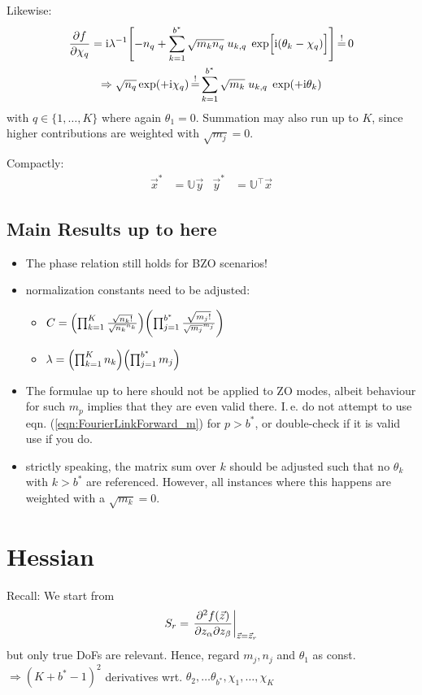 \documentclass[
	english,
	a4paper,
	fontsize=10pt,
	parskip=half,
	titlepage=true,
	DIV=12,
	final
]{scrreprt}
\newcommand*{\Thus}{\ensuremath{\Rightarrow}\xspace}
\newcommand*{\transp}{\ensuremath{^\intercal}}
\newcommand*{\iunit}{\ensuremath{\mathrm{i}}}
\newcommand*{\equalCond}{  \mathop{=}\limits^!  }
\begin{document}
Likewise:
\begin{gather}
	\pdv{f}{\chi_q}
=
	\iunit\lambda^{-1}
	\qty[
		- n_q
		+
		\sum_{k=1}^{b^*}
			\sqrt{m_k n_q} \; u_{k,q} \; \exp[ \Big. \iunit(\theta_k - \chi_q) ]
	]
	\label{eqn:JacobianChi_m}
\equalCond
	0 \\
\Thus
	\sqrt{n_q} \exp(+\iunit \chi_q)
\equalCond
	\sum_{k=1}^{b^*}
	\sqrt{m_k} \; u_{k,q} \; \exp(+\iunit\theta_k)
	\label{eqn:FourierLinkBackward_m}
\end{gather}
with $q \in \{1, \ldots, K\}$ where again $\theta_1 = 0$. Summation may also run up to $K$, since higher contributions are weighted with $\sqrt{m_j} = 0$.

Compactly:
\begin{align}
	\vec{x}^{*} &= \mathbb{U} \vec{y}
&
	\vec{y}^{*} &= \mathbb{U}\transp \vec{x}
	\label{eqn:MatrixCondition_m}
\end{align}

\subsection{Main Results up to here}
\begin{itemize}
\item The phase relation still holds for BZO scenarios!
\item normalization constants need to be adjusted:
	\begin{itemize}
	\item $C =
	\qty( \prod_{k=1}^{K}
		\frac
			{ \sqrt{n_k!} }
			{ \sqrt{n_k}^{n_k} }
	)
	\qty( \prod_{j=1}^{b^*}
		\frac
			{ \sqrt{m_j!} }
			{ \sqrt{m_j}^{m_j} }
	)$
	\item $\lambda =
	\qty( \prod_{k=1}^{K}   n_k )
	\qty( \prod_{j=1}^{b^*} m_j )$
	\end{itemize}
\item The formulae up to here should not be applied to ZO modes, albeit behaviour for such $m_p$
	implies that they are even valid there. I.\,e. do not attempt to use eqn.
	(\ref{eqn:FourierLinkForward_m}) for $p > b^*$, or double-check if it is valid use if you do.
\item strictly speaking, the matrix sum over $k$ should be adjusted such that no $\theta_k$ with
	$k > b^*$ are referenced. However, all instances where this happens are weighted with a
	$\sqrt{m_k} = 0$.
\end{itemize}

\section{Hessian}
Recall: We start from
\begin{align}
	S_r
=
	\eval{
		\pdv{f(\vec{z})}%
			{z_\alpha}{z_\beta}
	}_{\vec{z} = \vec{z}_r}
\end{align}
but only true DoFs are relevant. Hence, regard $m_j, n_j$ and $\theta_1$ as const. \\
\Thus $(K + b^* - 1)^{2}$ derivatives wrt. $\theta_2, \ldots \theta_{b^*}, \chi_1, \ldots, \chi_K$
\end{document}
